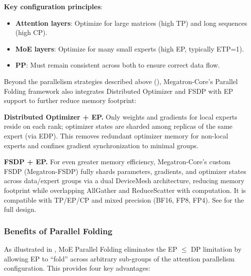 \textbf{Key configuration principles}:
\begin{itemize}
    \item \textbf{Attention layers}: Optimize for large matrices (high TP) and long sequences (high CP).
    \item \textbf{MoE layers}: Optimize for many small experts (high EP, typically ETP=1).
    \item \textbf{PP}: Must remain consistent across both to ensure correct data flow.
\end{itemize}

Beyond the parallelism strategies described above (), Megatron-Core's Parallel Folding framework also integrates Distributed Optimizer and FSDP with EP support to further reduce memory footprint:

\textbf{Distributed Optimizer + EP.} Only weights and gradients for local experts reside on each rank; optimizer states are sharded among replicas of the same expert (via EDP). This removes redundant optimizer memory for non-local experts and confines gradient synchronization to minimal groups.

\textbf{FSDP + EP.} For even greater memory efficiency, Megatron-Core's custom FSDP (Megatron-FSDP) fully shards parameters, gradients, and optimizer states across data/expert groups via a dual DeviceMesh architecture, reducing memory footprint while overlapping AllGather and ReduceScatter with computation. It is compatible with TP/EP/CP and mixed precision (BF16, FP8, FP4). See  for the full design.

\subsubsection{Benefits of Parallel Folding}

As illustrated in , MoE Parallel Folding eliminates the EP $\leq$ DP limitation by allowing EP to ``fold'' across arbitrary sub-groups of the attention parallelism configuration. This provides four key advantages:

